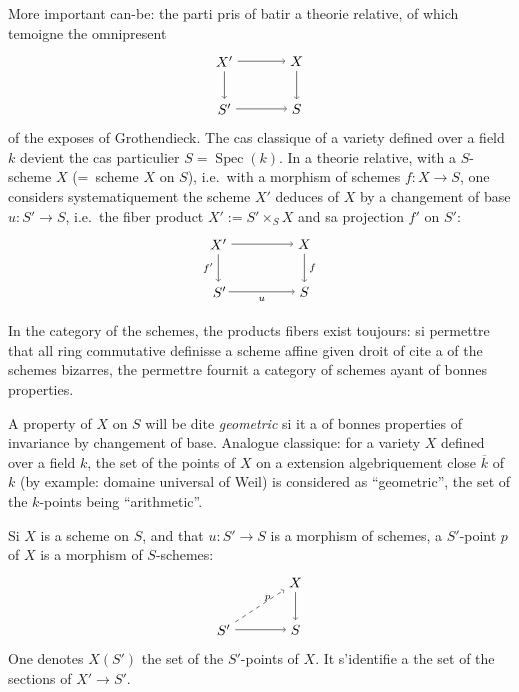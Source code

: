 \documentclass[11pt,a4paper]{article}
\theoremstyle{plain}
\theoremstyle{definition}
\DeclareMathOperator{\Spec}{Spec}
\begin{document}
More important can-be: the parti pris of batir a theorie relative, of which temoigne the omnipresent
\[
\begin{tikzpicture}[baseline=-0.5ex,scale=1.2]
\node (X') at (0,1) {$X'$};
\node (X) at (1.5,1) {$X$};
\node (S') at (0,0) {$S'$};
\node (S) at (1.5,0) {$S$};
\draw[->] (X') -- (X);
\draw[->] (X') -- (S');
\draw[->] (X) -- (S);
\draw[->] (S') -- (S);
\end{tikzpicture}
\]
of the exposes of Grothendieck. The cas classique of a variety defined over a field $k$ devient the cas particulier $S = \Spec(k)$. In a theorie relative, with a $S$-scheme $X$ (=~scheme $X$ on $S$), i.e.\ with a morphism of schemes $f \colon X \to S$, one considers systematiquement the scheme $X'$ deduces of $X$ by a changement of base $u \colon S' \to S$, i.e.\ the fiber product $X' := S' \times_S X$ and sa projection $f'$ on $S'$:
\[
\begin{tikzpicture}[baseline=-0.5ex,scale=1.2]
\node (X') at (0,1) {$X'$};
\node (X) at (1.8,1) {$X$};
\node (S') at (0,0) {$S'\!$};
\node (S) at (1.8,0) {$S$};
\draw[->] (X') -- (X);
\draw[->] (X') -- (S') node[midway,left] {$\scriptstyle f'$};
\draw[->] (X) -- (S) node[midway,right] {$\scriptstyle f$};
\draw[->] (S') -- (S) node[midway,below] {$\scriptstyle u$};
\end{tikzpicture}
\]

In the category of the schemes, the products fibers exist toujours: si permettre that all ring commutative definisse a scheme affine given droit of cite a of the schemes bizarres, the permettre fournit a category of schemes ayant of bonnes properties.

A property of $X$ on $S$ will be dite \emph{geometric} si it a of bonnes properties of invariance by changement of base. Analogue classique: for a variety $X$ defined over a field $k$, the set of the points of $X$ on a extension algebriquement close $\overline{k}$ of $k$ (by example: domaine universal of Weil) is considered as ``geometric'', the set of the $k$-points being ``arithmetic''.

Si $X$ is a scheme on $S$, and that $u \colon S' \to S$ is a morphism of schemes, a $S'$-point $p$ of $X$ is a morphism of $S$-schemes:
\[
\begin{tikzpicture}[baseline=-0.5ex,scale=1.2]
\node (X) at (1.5,1) {$X$};
\node (S') at (0,0) {$S'$};
\node (S) at (1.5,0) {$S$};
\draw[->] (X) -- (S);
\draw[->] (S') -- (S);
\draw[->,dashed] (S') -- (X) node[midway,above right] {$\scriptstyle p$};
\end{tikzpicture}
\]
One denotes $X(S')$ the set of the $S'$-points of $X$. It s'identifie a the set of the sections of $X' \to S'$.
\end{document}
